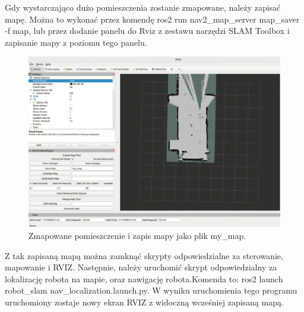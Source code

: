 \documentclass[a4paper,twoside,12pt]{book}
\begin{document}
\newpage
Gdy wystarczająco dużo pomieszczenia zostanie zmapowane, należy zapisać mapę. Można to wykonać przez komendę ros2 run nav2\_map\_server map\_saver -f map, lub przez dodanie panelu do Rviz z zestawu narzędzi SLAM Toolbox i zapisanie mapy z poziomu tego panelu.

\begin{figure}[!hb]
	\centering
	\includegraphics[width=1\textwidth]{images/save-map.png}
	\caption{Zmapowane pomieszczenie i zapis mapy jako plik my\_map.}
	\label{fig:save-map}
\end{figure}
\newpage
Z tak zapisaną mapą można zamknąć skrypty odpowiedzialne za sterowanie, mapowanie i RVIZ.
\newline\newline
Następnie, należy uruchomić skrypt odpowiedzialny za lokalizację robota na mapie, oraz nawigację robota.\newline Komenda to: ros2 launch robot\_slam nav\_localization.launch.py. 
W wyniku uruchomienia tego programu uruchomiony zostaje nowy ekran RVIZ z widoczną wcześniej zapisaną mapą.
\end{document}
